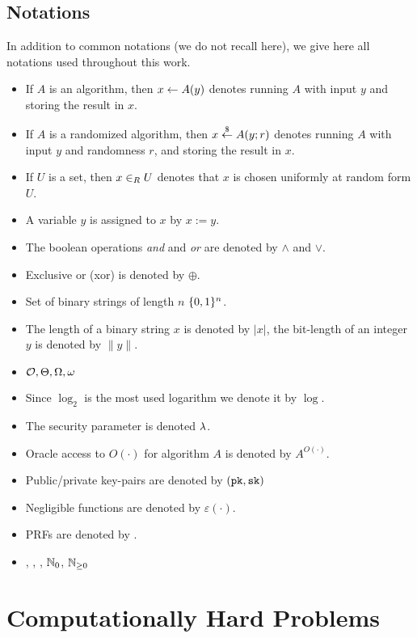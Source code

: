 \subsection{Notations}
In addition to common notations (we do not recall here), we give here all notations used throughout this work.
\begin{itemize}
	\item If $A$ is an algorithm, then $x\gets A(y)$ denotes running $A$ with input $y$ and storing the result in $x$.
	\item If $A$ is a randomized algorithm, then $x\stackrel{\$}{\gets} A(y;r)$ denotes running $A$ with input $y$ and randomness $r$, and storing the result in $x$.
	\item If $U$ is a set, then $x\in_R U$ denotes that $x$ is chosen uniformly at random form $U$.
	\item A variable $y$ is assigned to $x$ by $x:=y$.
	\item The boolean operations \emph{and} and \emph{or} are denoted by $\wedge$ and $\vee$.
	\item Exclusive or (xor) is denoted by $\oplus$.
	\item Set of binary strings of length $n$ $\{0,1\}^n$.
	\item The length of a binary string $x$ is denoted by $|x|$, the bit-length of an integer $y$ is denoted by $\|y\|$.
	\item $\mathcal{O},\Theta,\Omega,\omega$
	\item Since $\log_2$ is the most used logarithm we denote it by $\log$.
	\item The security parameter is denoted $\lambda$.
	\item Oracle access to $O(\cdot)$ for algorithm $A$ is denoted by $A^{O(\cdot)}$.
	\item Public/private key-pairs are denoted by $(\mathtt{pk},\mathtt{sk})$
	\item Negligible functions are denoted by $\varepsilon(\cdot)$.
	\item \aclp{PRF} are denoted by \PRF.
	\item \ZZ, \NN, \RR, $\mathbb{N}_0$, $\mathbb{N}_{\geq 0}$
\end{itemize}

\section{Computationally Hard Problems}


